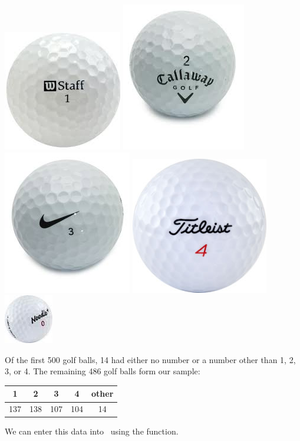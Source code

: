 \begin{center}
\includegraphics[width=.14\textwidth]{images/Wilson1}
\quad 
\includegraphics[width=.14\textwidth,trim=0mm 1cm 0mm 0cm,clip]{images/Callaway2}
\quad 
\includegraphics[width=.14\textwidth,trim=0mm 6mm 0mm 0mm,clip]{images/Nike3}
\quad 
\includegraphics[width=.14\textwidth]{images/Titleist4}
\quad 
\includegraphics[width=.14\textwidth]{images/Noodle0}
\end{center}

Of the first 500 golf balls, 14 had either no number or a number other than 1, 2, 3, or 4.
The remaining 486 golf balls form our sample:


\begin{center}
\begin{tabular}{|c|c|c|c|c|}
\hline
1 & 2 & 3 & 4 & other\\
\hline
\hline
137 & 138 & 107 & 104 & 14 \\
\hline
\end{tabular}
\end{center}
We can enter this data into \R\ using the  function.
\begin{knitrout}
\end{knitrout}


